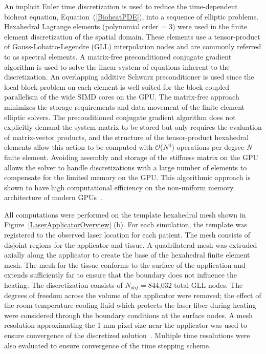 \documentclass[12pt]{article}
\newcommand{\eqn}[1]{(\ref{#1})}
\begin{document}
An implicit Euler time discretization is used to reduce the 
time-dependent bioheat equation, Equation~\eqn{BioheatPDE}, into a sequence of elliptic problems. 
Hexahedral Lagrange elements (polynomial order = 3) were used in the finite
element discretization of the spatial domain.
These elements use a tensor-product of Gauss-Lobatto-Legendre (GLL) interpolation
nodes and are commonly referred to as spectral elements.  
A matrix-free preconditioned conjugate gradient algorithm is used to solve the
linear system of equations inherent to the discretization.  
An overlapping additive Schwarz preconditioner is used since the local
block problem on each element is well suited for the block-coupled
parallelism of the wide SIMD cores on the GPU.  
The matrix-free approach minimizes the storage
requirements and data movement of the finite element elliptic solvers.  The
preconditioned conjugate gradient algorithm does not explicitly demand the system
matrix to be stored but only requires the evaluation of matrix-vector products,
and the structure of the tensor-product hexahedral elements allow this action
to be computed with $\mathcal{O}$($N^4$) operations per degree-\textit{N} finite
element.  
Avoiding assembly and storage of the stiffness matrix on the GPU
allows the solver to handle discretizations with a large number of elements to
compensate for the limited memory on the GPU.  This algorithmic approach is
shown to have high computational efficiency on the non-uniform memory
architecture of modern GPUs~\cite{Medina2014}.

All computations were performed on the template hexahedral mesh
shown in Figure~\ref{LaserApplicatorOverview} (b).
For each simulation, the template was registered to the observed
laser location for each patient.
The mesh consists of disjoint regions for the applicator and tissue.
A quadrilateral mesh was extruded axially along the applicator to create
the base of the hexahedral finite element mesh. The mesh for the tissue
conforms to the surface of the application and extends sufficiently far
to ensure that the boundary does not influence the heating.
The discretization consists of $N_{dof}=$844,032 total GLL nodes. 
The degrees of freedom across the volume of the applicator were removed;
the effect of the room-temperature cooling fluid which protects the laser fiber
during heating were considered through the boundary conditions at the surface
nodes. 
{\color{red}
A mesh resolution approximating the 1 mm pixel size near the applicator was used
to ensure convergence of the discretized solution~\cite{fuentesetal11a}. 
Multiple time resolutions were also evaluated to ensure convergence of the
time stepping scheme.
}
\end{document}
